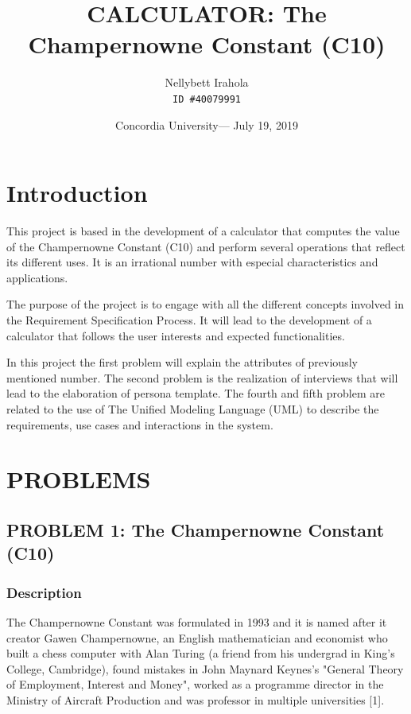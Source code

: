 \documentclass{report}
\title{\vspace{-2cm}CALCULATOR: The Champernowne Constant (C10)} %
\author{Nellybett Irahola\\ \texttt{ID \#40079991}} %
\date{Concordia University--- July 19, 2019} %
\begin{document}
\maketitle %


\tableofcontents{}

\listoffigures

\chapter{Introduction}

This project is based in the development of a calculator that computes the value of the Champernowne Constant (C10) and perform several operations that reflect its different uses. It is an irrational number with especial characteristics and applications.

The purpose of the project is to engage with all the different concepts involved in the Requirement Specification Process. It will lead to the development of a calculator that follows the user interests and expected functionalities.

In this project the first problem will explain the attributes of previously mentioned number. The second problem is the realization of interviews that will lead to the elaboration of persona template. The fourth and fifth problem are related to the use of The Unified Modeling Language (UML) to describe the requirements, use cases and interactions in the system.
\chapter{PROBLEMS}
\section{PROBLEM 1: The Champernowne Constant (C10)}
\subsection{Description} %

The Champernowne Constant was formulated in 1993 and it is named after it creator Gawen Champernowne, an English mathematician and economist who built a chess computer with Alan Turing (a friend from his undergrad in King’s College, Cambridge), found mistakes in John Maynard Keynes's "General Theory of Employment, Interest and Money", worked as a programme director in the Ministry of Aircraft Production and was professor in multiple universities [1].  
\end{document}
